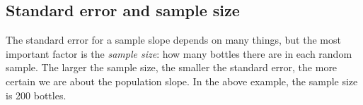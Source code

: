 \documentclass[]{book}\usepackage[]{graphicx}\usepackage[]{color}
\begin{document}
\subsection{Standard error and sample size}\label{sec:sampsizese}

The standard error for a sample slope depends on many things, but the most important factor is the \textit{sample size}: how many bottles there are in each random sample. The larger the sample size, the smaller the standard error, the more certain we are about the population slope. In the above example, the sample size is 200 bottles.



\end{document}
